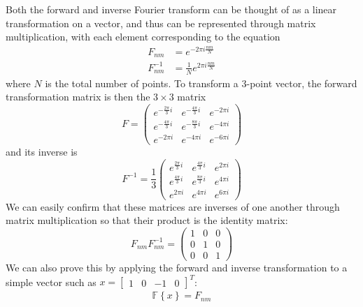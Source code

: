 \message{ !name(austin_report.tex)}\documentclass[11pt, letterpage]{article}
\begin{document}
Both the forward and inverse Fourier transform can be thought of as a linear
transformation on a vector, and thus can be represented through matrix
multiplication, with each element corresponding to the equation
\begin{equation}
  \begin{aligned}
    F_{nm} &= e^{- 2 \pi i \frac{nm}{N}} \\
    F_{nm}^{-1} &= \frac{1}{N} e^{2 \pi i \frac{nm}{N}}
  \end{aligned}
  \label{fft_mat_el}
\end{equation}
where $N$ is the total number of points. To transform a $3$-point vector, the
forward transformation matrix is then the $3 \times 3$ matrix
\begin{equation}
  F =
  \begin{pmatrix}
    e^{- \frac{2 \pi}{3} i} & e^{- \frac{4 \pi}{3} i} & e^{- 2 \pi i} \\
    e^{- \frac{4 \pi}{3} i} & e^{- \frac{8 \pi}{3} i} & e^{- 4 \pi i} \\
    e^{- 2 \pi i} & e^{- 4 \pi i} & e^{- 6 \pi i}
  \end{pmatrix}
\end{equation}
and its inverse is
\begin{equation}
  F^{-1} = \frac{1}{3}
  \begin{pmatrix}
    e^{\frac{2 \pi}{3} i} & e^{\frac{4 \pi}{3} i} & e^{2 \pi i} \\
    e^{\frac{4 \pi}{3} i} & e^{\frac{8 \pi}{3} i} & e^{4 \pi i} \\
    e^{2 \pi i} & e^{4 \pi i} & e^{6 \pi i}
  \end{pmatrix}
\end{equation}
We can easily confirm that these matrices are inverses of one another through
matrix multiplication so that their product is the identity matrix:
\begin{equation}
  F_{nm}F_{nm}^{-1}
  = \begin{pmatrix}
    1 & 0 & 0 \\
    0 & 1 & 0 \\
    0 & 0 & 1
  \end{pmatrix}
\end{equation}
We can also prove this by applying the forward and inverse transformation to a
simple vector such as $x = \begin{bmatrix} 1 & 0 & -1 & 0 \end{bmatrix}^T$:
\begin{equation}
  \begin{aligned}
    \mathbb{F} \left\{ x \right\}
    = F_{nm}
  \end{aligned}
\end{equation}
\end{document}
